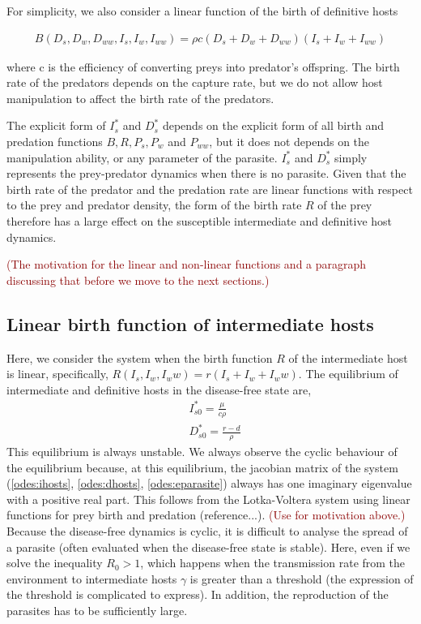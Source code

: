 \documentclass[11pt]{article}
\newcommand{\cha}[1]{\textcolor{darkred}{(#1)}}
\begin{document}
For simplicity, we also consider a linear function of the birth of definitive hosts

\begin{align*}
B(D_s, D_w, D_{ww}, I_s, I_w, I_{ww}) = \rho c (D_s + D_w + D_{ww}) (I_s + I_w + I_{ww})
\end{align*}

where c is the efficiency of converting preys into predator's offspring. 
The birth rate of the predators depends on the capture rate, but we do not allow host manipulation to affect the birth rate of the predators.

The explicit form of $I_s^*$ and $D_s^*$ depends on the explicit form of all birth and predation functions $B, R, P_s, P_w$ and $P_{ww}$, but it does not depends on the manipulation ability, or any parameter of the parasite. $I_s^*$ and $D_s^*$ simply represents the prey-predator dynamics when there is no parasite. Given that the birth rate of the predator and the predation rate are linear functions with respect to the prey and predator density, the form of the birth rate $R$ of the prey therefore has a large effect on the susceptible intermediate and definitive host dynamics. 

\cha{The motivation for the linear and non-linear functions and a paragraph discussing that before we move to the next sections.}

\subsection*{Linear birth function of intermediate hosts}
Here, we consider the system when the birth function $R$ of the intermediate host is linear, specifically, $R(I_s, I_w, I_ww) = r(I_s + I_w + I_ww)$. 
The equilibrium of intermediate and definitive hosts in the disease-free state are,
%
\begin{align*}
& I_{s0}^* = \frac{\mu}{c \rho} \\
& D_{s0}^* = \frac{r - d}{\rho}
\end{align*}
%
This equilibrium is always unstable. 
We always observe the cyclic behaviour of the equilibrium because, at this equilibrium, the jacobian matrix of the system (\ref{odes:ihosts}, \ref{odes:dhosts}, \ref{odes:eparasite}) always has one imaginary eigenvalue with a positive real part. 
This follows from the Lotka-Voltera system using linear functions for prey birth and predation (reference...). \cha{Use for motivation above.}
Because the disease-free dynamics is cyclic, it is difficult to analyse the spread of a parasite (often evaluated when the disease-free state is stable). 
Here, even if we solve the inequality $R_0 > 1$, which happens when the transmission rate from the environment to intermediate hosts $\gamma$ is greater than a threshold (the expression of the threshold is complicated to express). 
In addition, the reproduction of the parasites has to be sufficiently large.
\end{document}
